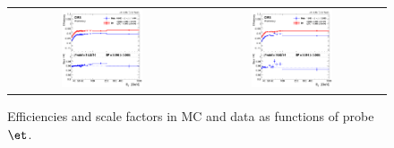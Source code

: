 \begin{figure}[bh]
  \begin{center}
    \begin{tabular}{cc}
      \includegraphics[width=0.45\textwidth]{figures/Zprime/2017/ScaleFactor/Fit_method/Run2017BCDEF_barrel_Et_DYToEE_amc/passingHEEP/egammaEffi_txt_egammaPlots_Et.png} &
      \includegraphics[width=0.45\textwidth]{figures/Zprime/2017/ScaleFactor/Fit_method/Run2017BCDEF_endcap_Et_DYToEE_amc/passingHEEP/egammaEffi_txt_egammaPlots_Et.png} \\
    \end{tabular}
    \caption{Efficiencies and scale factors in MC and data as functions of probe $\et$.}
    \label{fig:eff_fit}
  \end{center}
\end{figure}

